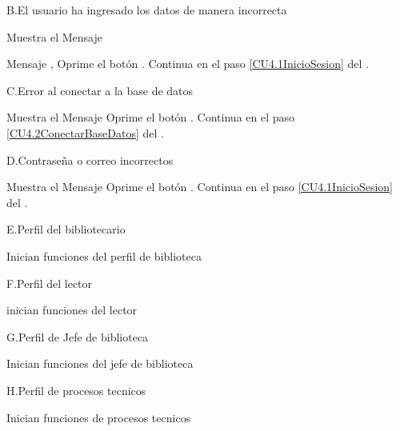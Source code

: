 		\begin{UCtrayectoriaA}{B.}{El usuario ha ingresado los datos de manera incorrecta}

			\UCpaso Muestra el Mensaje \item Mensaje ,
			\UCpaso[\UCactor] Oprime el botón .
			\UCpaso Continua en el paso \ref{CU4.1InicioSesion} del .

		\end{UCtrayectoriaA}

		\begin{UCtrayectoriaA}{C.}{Error al conectar a la base de datos}

			\UCpaso Muestra el Mensaje 
			\UCpaso[\UCactor] Oprime el botón .
			\UCpaso Continua en el paso \ref{CU4.2ConectarBaseDatos} del .

		\end{UCtrayectoriaA}

		\begin{UCtrayectoriaA}{D.}{Contraseña o correo incorrectos}

			\UCpaso Muestra el Mensaje 
			\UCpaso[\UCactor] Oprime el botón .
			\UCpaso Continua en el paso \ref{CU4.1InicioSesion} del .

		\end{UCtrayectoriaA}

		\begin{UCtrayectoriaA}{E.}{Perfil del bibliotecario}

			\UCpaso Inician funciones del perfil de biblioteca

		\end{UCtrayectoriaA}


		\begin{UCtrayectoriaA}{F.}{Perfil del lector}

			\UCpaso inician funciones del lector
		\end{UCtrayectoriaA}


		\begin{UCtrayectoriaA}{G.}{Perfil de Jefe de biblioteca}

			\UCpaso Inician funciones del jefe de biblioteca
		\end{UCtrayectoriaA}

		\begin{UCtrayectoriaA}{H.}{Perfil de procesos tecnicos}

			\UCpaso Inician funciones de procesos tecnicos

		\end{UCtrayectoriaA}								
